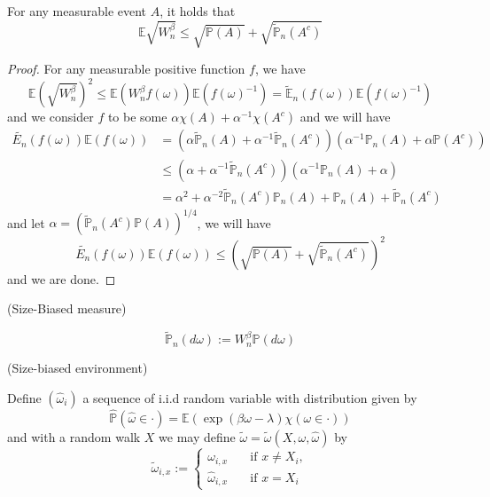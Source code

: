 \begin{lemma}
    For any measurable event $A$, it holds that
    \[
    \mathbb{E}\sqrt{W_n^{\beta}} \leq \sqrt{\mathbb{P}(A)} + \sqrt{\tilde{\mathbb{P}}_n(A^c)} 
    \]
\end{lemma}
\begin{proof}
    For any measurable positive function $f$, we have
    \[
    \mathbb{E}(\sqrt{W_n^{\beta}})^2 \leq \mathbb{E}(W_n^{\beta}f(\omega))\mathbb{E}(f(\omega)^{-1}) = \widetilde{\mathbb{E}}_n(f(\omega))\mathbb{E}(f(\omega)^{-1})
    \]
    and we consider $f$ to be some $\alpha \chi(A) + \alpha^{-1}\chi(A^c)$ and we will have
    \[
    \begin{aligned}
        \widetilde{E_n}(f(\omega))\mathbb{E}(f(\omega)) &= (\alpha \widetilde{\mathbb{P}}_n(A) + \alpha^{-1}\widetilde{\mathbb{P}}_n(A^c))(\alpha^{-1}\mathbb{P}_n(A) + \alpha\mathbb{P}(A^c)) \\
        &\leq (\alpha + \alpha^{-1}\widetilde{\mathbb{P}}_n(A^c))(\alpha^{-1}\mathbb{P}_n(A) + \alpha) \\
        &= \alpha^2 +\alpha^{-2}\widetilde{\mathbb{P}}_n(A^c)\mathbb{P}_n(A) + \mathbb{P}_n(A) + \widetilde{\mathbb{P}}_n(A^c)
    \end{aligned}
    \]
    and let $\alpha = (\widetilde{\mathbb{P}}_n(A^c)\mathbb{P}(A))^{1/4}$, we will have
    \[
    \widetilde{E_n}(f(\omega))\mathbb{E}(f(\omega)) \leq \left(\sqrt{\mathbb{P}(A)}+\sqrt{\widetilde{\mathbb{P}}_n(A^c)}\right)^2
    \]
    and we are done.
\end{proof}


\begin{definition}
    (Size-Biased measure)\par
    \[
    \widetilde{\mathbb{P}}_n(d\omega):= W_n^{\beta}\mathbb{P}(d\omega)
    \]
\end{definition}

\begin{definition}
    (Size-biased environment)\par
    Define $(\widehat{\omega}_i)$ a sequence of i.i.d random variable with distribution given by
    \[
    \widehat{\mathbb{P}}(\hat{\omega} \in \cdot) = \mathbb{E}(\exp(\beta\omega - \lambda)\chi(\omega \in \cdot))
    \]
    and with a random walk $X$ we may define $\widetilde{\omega} = \widetilde{\omega}(X,\omega,\hat{\omega})$ by
    \[
    \tilde{\omega}_{i,x} := \begin{cases}
        \omega_{i,x}\quad&\text{if }x\neq X_i,\\
        \hat{\omega}_{i,x}&\text{if }x=X_i
    \end{cases}
    \]
\end{definition}

